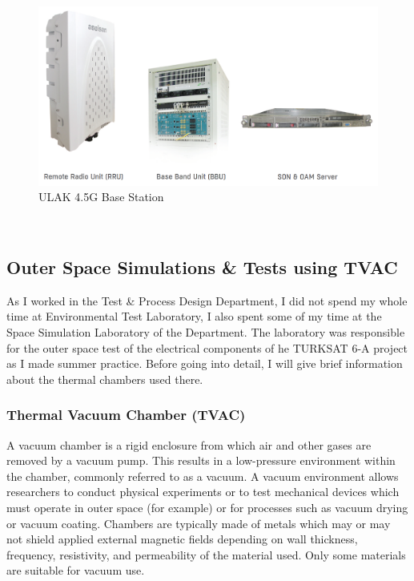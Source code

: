 \begin{figure}[H]
	\center
	\setlength{\unitlength}{\textwidth} 
	\includegraphics[width=1.0\unitlength]{ulak}
	\caption{\label{fig:ulak}ULAK 4.5G Base Station\cite{ulak} }
\end{figure}	
	
	
\-\\

\subsection{Outer Space Simulations \& Tests using TVAC  }
\- \indent
	As I worked in the Test \& Process Design Department, I did not spend my whole time at Environmental Test Laboratory, I also spent some of my time at the Space Simulation Laboratory of the Department. The laboratory was responsible for the outer space test of the electrical components of he TURKSAT 6-A project as I made summer practice. Before going into detail, I will give brief information about the thermal chambers used there.
	
\subsubsection{Thermal Vacuum Chamber (TVAC) }
\- \indent
	A vacuum chamber is a rigid enclosure from which air and other gases are removed by a vacuum pump. This results in a low-pressure environment within the chamber, commonly referred to as a vacuum. A vacuum environment allows researchers to conduct physical experiments or to test mechanical devices which must operate in outer space (for example) or for processes such as vacuum drying or vacuum coating. Chambers are typically made of metals which may or may not shield applied external magnetic fields depending on wall thickness, frequency, resistivity, and permeability of the material used. Only some materials are suitable for vacuum use\cite{tvac}.


